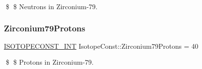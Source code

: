 \$ \$ Neutrons in Zirconium-\/79. \mbox{\label{group___isotope_const-_zirconium-_zr79_ga777cef93fb3bd3a1607be246cb507846}} 
\subsubsection{\texorpdfstring{Zirconium79\+Protons}{Zirconium79Protons}}
{\footnotesize\ttfamily \mbox{\hyperlink{group___isotope_const-_macros_ga5f18360b3e99483a35c32d789e62621c}{I\+S\+O\+T\+O\+P\+E\+C\+O\+N\+S\+T\+\_\+\+I\+NT}} Isotope\+Const\+::\+Zirconium79\+Protons = 40}

\$ \$ Protons in Zirconium-\/79. 